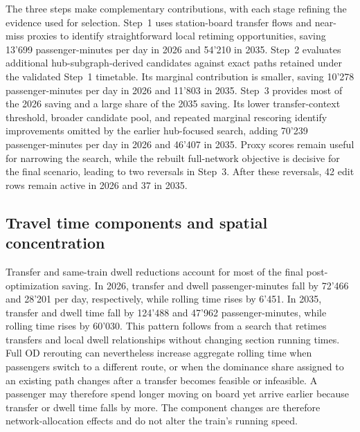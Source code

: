 \documentclass[preprint,12pt]{elsarticle}
\begin{document}
The three steps make complementary contributions, with each stage refining the evidence used for selection. Step~1 uses station-board transfer flows and near-miss proxies to identify straightforward local retiming opportunities, saving 13'699 passenger-minutes per day in 2026 and 54'210 in 2035. Step~2 evaluates additional hub-subgraph-derived candidates against exact paths retained under the validated Step~1 timetable. Its marginal contribution is smaller, saving 10'278 passenger-minutes per day in 2026 and 11'803 in 2035. Step~3 provides most of the 2026 saving and a large share of the 2035 saving. Its lower transfer-context threshold, broader candidate pool, and repeated marginal rescoring identify improvements omitted by the earlier hub-focused search, adding 70'239 passenger-minutes per day in 2026 and 46'407 in 2035. Proxy scores remain useful for narrowing the search, while the rebuilt full-network objective is decisive for the final scenario, leading to two reversals in Step~3. After these reversals, 42 edit rows remain active in 2026 and 37 in 2035.

\newpage
\subsection{Travel time components and spatial concentration}\label{sec:discussion-part2-mechanisms}

Transfer and same-train dwell reductions account for most of the final post-optimization saving. In 2026, transfer and dwell passenger-minutes fall by 72'466 and 28'201 per day, respectively, while rolling time rises by 6'451. In 2035, transfer and dwell time fall by 124'488 and 47'962 passenger-minutes, while rolling time rises by 60'030. This pattern follows from a search that retimes transfers and local dwell relationships without changing section running times. Full OD rerouting can nevertheless increase aggregate rolling time when passengers switch to a different route, or when the dominance share assigned to an existing path changes after a transfer becomes feasible or infeasible. A passenger may therefore spend longer moving on board yet arrive earlier because transfer or dwell time falls by more. The component changes are therefore network-allocation effects and do not alter the train's running speed.
\end{document}
